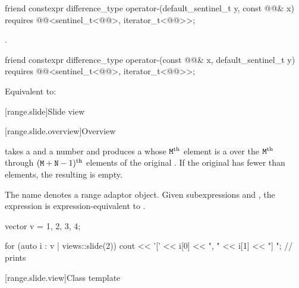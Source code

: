\begin{itemdecl}
friend constexpr difference_type operator-(default_sentinel_t y, const @@& x)
  requires @@<sentinel_t<@@>, iterator_t<@@>>;
\end{itemdecl}

\begin{itemdescr}
\pnum
\returns
{}.
\end{itemdescr}

\begin{itemdecl}
friend constexpr difference_type operator-(const @@& x, default_sentinel_t y)
  requires @@<sentinel_t<@@>, iterator_t<@@>>;
\end{itemdecl}

\begin{itemdescr}
\pnum
\effects
Equivalent to: 
\end{itemdescr}

[range.slide]{Slide view}

[range.slide.overview]{Overview}

\pnum
{} takes a  and a number  and
produces a 
whose $\texttt{M}^\text{th}$ element is a  over
the $\texttt{M}^\text{th}$ through
$(\texttt{M} + \texttt{N} - 1)^\text{th}$ elements
of the original .
If the original  has fewer than  elements,
the resulting  is empty.

\pnum
{}%
The name  denotes
a range adaptor object.
Given subexpressions  and ,
the expression  is expression-equivalent to
.
\begin{example}
\begin{codeblock}
vector v = {1, 2, 3, 4};

for (auto i : v | views::slide(2)) {
  cout << '[' << i[0] << ", " << i[1] << "] ";          // prints \tcode{[1, 2] [2, 3] [3, 4]}
}
\end{codeblock}
\end{example}

[range.slide.view]{Class template }

